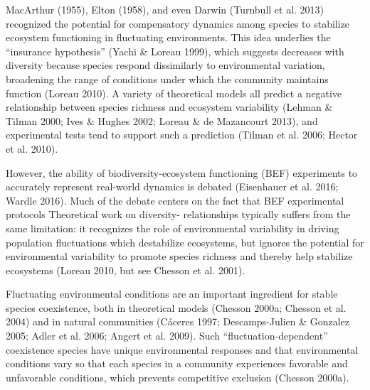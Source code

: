 \documentclass[12pt,]{article}
\begin{document}
MacArthur (1955), Elton (1958), and even Darwin (Turnbull et al. 2013)
recognized the potential for compensatory dynamics among species to
stabilize ecosystem functioning in fluctuating environments. This idea
underlies the ``insurance hypothesis'' (Yachi \& Loreau 1999), which
suggests
decreases with diversity because species respond dissimilarly to
environmental variation, broadening the range of conditions under which
the community maintains function (Loreau 2010). A variety of theoretical
models all predict a negative relationship between species richness and
ecosystem variability (Lehman \& Tilman 2000; Ives \& Hughes 2002;
Loreau \& de Mazancourt 2013), and experimental tests tend to support
such a prediction (Tilman et al. 2006; Hector et al. 2010).

However, the ability of biodiversity-ecosystem functioning (BEF)
experiments to accurately represent real-world dynamics is debated
(Eisenhauer et al. 2016; Wardle 2016). Much of the debate centers on the
fact that BEF experimental protocols
Theoretical work on diversity- relationships
typically suffers from the same limitation: it recognizes the role of
environmental variability in driving population fluctuations which
destabilize ecosystems, but ignores the potential for environmental
variability to promote species richness and thereby help stabilize
ecosystems (Loreau 2010, but see Chesson et al. 2001).

Fluctuating environmental conditions are an important ingredient for
stable species coexistence, both in theoretical models (Chesson 2000a;
Chesson et al. 2004) and in natural communities (Cáceres 1997;
Descamps-Julien \& Gonzalez 2005; Adler et al. 2006; Angert et al.
2009). Such ``fluctuation-dependent'' coexistence
 species have unique environmental
responses and that environmental conditions vary so that each species in
a community experiences favorable and unfavorable conditions, which
prevents competitive exclusion (Chesson 2000a).
\end{document}
